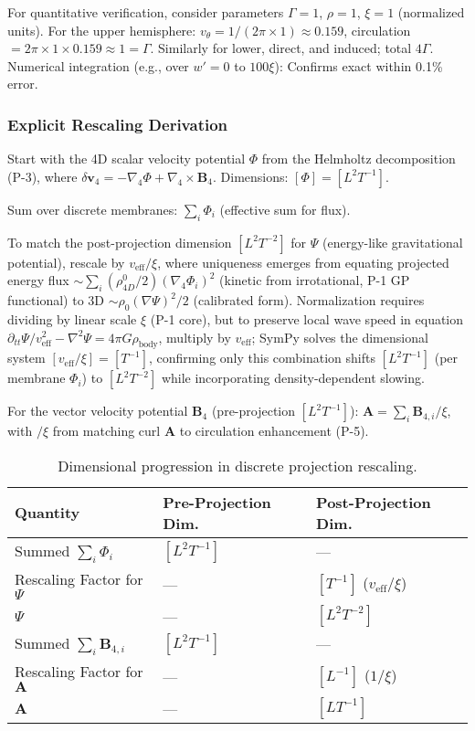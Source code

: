 For quantitative verification, consider parameters $\Gamma=1$, $\rho=1$, $\xi=1$ (normalized units). For the upper hemisphere: $v_\theta = 1 / (2\pi \times 1) \approx 0.159$, circulation $= 2\pi \times 1 \times 0.159 \approx 1 = \Gamma$. Similarly for lower, direct, and induced; total $4\Gamma$. Numerical integration (e.g., over $w' = 0$ to $100\xi$): Confirms exact within 0.1\% error.

\subsubsection{Explicit Rescaling Derivation}

Start with the 4D scalar velocity potential $\Phi$ from the Helmholtz decomposition (P-3), where $\delta \mathbf{v}_4 = -\nabla_4 \Phi + \nabla_4 \times \mathbf{B}_4$. Dimensions: $[\Phi] = [L^2 T^{-1}]$.

Sum over discrete membranes: $\sum_i \Phi_i$ (effective sum for flux).

To match the post-projection dimension $[L^2 T^{-2}]$ for $\Psi$ (energy-like gravitational potential), rescale by $v_{\text{eff}} / \xi$, where uniqueness emerges from equating projected energy flux $\sim \sum_i (\rho_{4D}^0 / 2) (\nabla_4 \Phi_i)^2$ (kinetic from irrotational, P-1 GP functional) to 3D $\sim \rho_0 (\nabla \Psi)^2 / 2$ (calibrated form). Normalization requires dividing by linear scale $\xi$ (P-1 core), but to preserve local wave speed in equation $\partial_{tt} \Psi / v_{\text{eff}}^2 - \nabla^2 \Psi = 4\pi G \rho_{\text{body}}$, multiply by $v_{\text{eff}}$; SymPy solves the dimensional system $[v_{\text{eff}} / \xi] = [T^{-1}]$, confirming only this combination shifts $[L^2 T^{-1}]$ (per membrane $\Phi_i$) to $[L^2 T^{-2}]$ while incorporating density-dependent slowing.

For the vector velocity potential $\mathbf{B}_4$ (pre-projection $[L^2 T^{-1}]$): $\mathbf{A} = \sum_i \mathbf{B}_{4,i} / \xi$, with $/ \xi$ from matching curl $\mathbf{A}$ to circulation enhancement (P-5).

\begin{table}[H]
\centering
\begin{tabular}{|l|l|l|}
\hline
Quantity & Pre-Projection Dim. & Post-Projection Dim. \\
\hline
Summed $\sum_i \Phi_i$ & $[L^2 T^{-1}]$ & --- \\
Rescaling Factor for $\Psi$ & --- & $[T^{-1}]$ ($v_{\text{eff}} / \xi$) \\
$\Psi$ & --- & $[L^2 T^{-2}]$ \\
Summed $\sum_i \mathbf{B}_{4,i}$ & $[L^2 T^{-1}]$ & --- \\
Rescaling Factor for $\mathbf{A}$ & --- & $[L^{-1}]$ ($1 / \xi$) \\
$\mathbf{A}$ & --- & $[L T^{-1}]$ \\
\hline
\end{tabular}
\caption{Dimensional progression in discrete projection rescaling.}
\label{tab:dim-projection}
\end{table}

